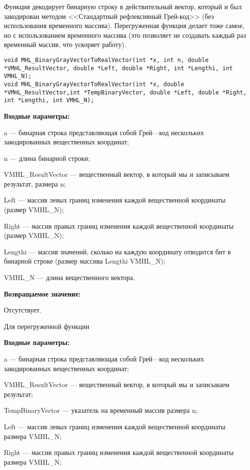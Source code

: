 \documentclass[a4paper,12pt]{article}
\begin{document}
Функция декодирует бинарную строку в действительный вектор, который и был закодирован методом <<Стандартный рефлексивный Грей-код>> (без использования временного массива). Перегруженная функция делает тоже самое, но с использованием временного массива (это позволяет не создавать каждый раз временный массив, что ускоряет работу).


\begin{lstlisting}[label=code_syntax_MHL_BinaryGrayVectorToRealVector,caption=Синтаксис]
void MHL_BinaryGrayVectorToRealVector(int *x, int n, double *VMHL_ResultVector, double *Left, double *Right, int *Lengthi, int VMHL_N);
void MHL_BinaryGrayVectorToRealVector(int *x, double *VMHL_ResultVector,int *TempBinaryVector, double *Left, double *Right, int *Lengthi, int VMHL_N);
\end{lstlisting}

\textbf{Входные параметры:}
 
a --- бинарная строка представляющая собой Грей---код нескольких закодированных вещественных координат;
 
n --- длина бинарной строки;
 
VMHL\_ResultVector --- вещественный вектор, в который мы и записываем результат, размера n;
 
Left --- массив левых границ изменения каждой вещественной координаты (размер VMHL\_N);
 
Right --- массив правых границ изменения каждой вещественной координаты (размер VMHL\_N);
 
Lengthi --- массив значений, сколько на каждую координату отводится бит в бинарной строке (размер массива Lengthi VMHL\_N);
 
VMHL\_N --- длина вещественного вектора.
 

\textbf{Возвращаемое значение:}
 
Отсутствует.
  
Для перегруженной функции
  
\textbf{Входные параметры:}
 
a --- бинарная строка представляющая собой Грей---код нескольких закодированных вещественных координат;
 
VMHL\_ResultVector --- вещественный вектор, в который мы и записываем результат;
 
TempBinaryVector --- указатель на временный массив  размера n;
 
Left --- массив левых границ изменения каждой вещественной координаты размера VMHL\_N;
 
Right --- массив правых границ изменения каждой вещественной координаты размера VMHL\_N;
 
\end{document}
